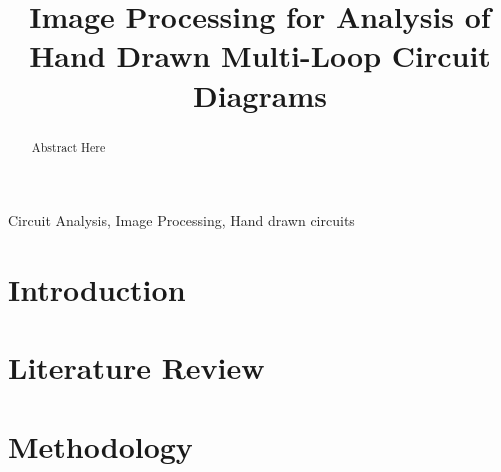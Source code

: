 \documentclass[conference]{IEEEtran}
\begin{document}
\title{Image Processing for Analysis of Hand Drawn Multi-Loop Circuit Diagrams}


\author{
\and
{}
}

\maketitle

\begin{abstract}
Abstract Here
\end{abstract}

\begin{IEEEkeywords}
Circuit Analysis, Image Processing, Hand drawn circuits
\end{IEEEkeywords}

\section{\textbf{Introduction}}


\section{\textbf{Literature Review}}




\section{\textbf{Methodology}}



\end{document}

